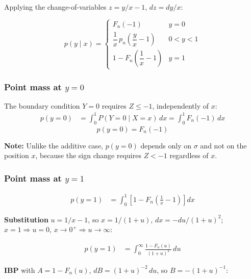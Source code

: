 Applying the change-of-variables $z = y/x - 1$, $dz = dy/x$:

\begin{equation}
  p(y \mid x) = \begin{cases}
    F_n(-1) & y = 0 \\[4pt]
    \dfrac{1}{x}\,p_n\!\left(\dfrac{y}{x} - 1\right) & 0 < y < 1 \\[8pt]
    1 - F_n\!\left(\dfrac{1}{x} - 1\right) & y = 1
  \end{cases}
  \label{eq:conditional_mult}
\end{equation}

\subsubsection*{Point mass at $y = 0$}

The boundary condition $Y = 0$ requires $Z \leq -1$, independently of $x$:
\begin{align*}
  p(y = 0)
    &= \int_0^1 P(Y=0 \mid X=x)\,dx
     = \int_0^1 F_n(-1)\,dx
\end{align*}
\begin{equation}
  \boxed{p(y=0) = F_n(-1)}
  \label{eq:mass0_mult}
\end{equation}

\textbf{Note:} Unlike the additive case, $p(y=0)$ depends only on $\sigma$
and not on the position $x$, because the sign change requires $Z < -1$
regardless of $x$.

\subsubsection*{Point mass at $y = 1$}

\begin{align*}
  p(y=1)
    &= \int_0^1 \left[1 - F_n\!\left(\tfrac{1}{x}-1\right)\right] dx
\end{align*}

\textbf{Substitution} $u = 1/x - 1$, so $x = 1/(1+u)$,
$dx = -du/(1+u)^2$; $x=1 \Rightarrow u=0$, $x \to 0^+ \Rightarrow u \to \infty$:

\begin{align*}
  p(y=1)
    &= \int_0^{\infty} \frac{1-F_n(u)}{(1+u)^2}\,du
\end{align*}

\textbf{IBP} with $A = 1-F_n(u)$, $dB = (1+u)^{-2}\,du$,
so $B = -(1+u)^{-1}$:

